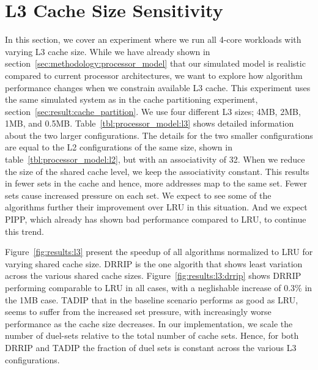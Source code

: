 \section{L3 Cache Size Sensitivity}
\label{sec:results:l3size_sensitivity}

In this section, we cover an experiment where we run all 4-core workloads with varying L3 cache size.
While we have already shown in section~\ref{sec:methodology:processor_model} that our simulated model is realistic compared to current processor architectures, we want to explore how algorithm performance changes when we constrain available L3 cache.
This experiment uses the same simulated system as in the cache partitioning experiment, section~\ref{sec:result:cache_partition}.
We use four different L3 sizes; 4MB, 2MB, 1MB, and 0.5MB.
Table~\ref{tbl:processor_model:l3} shows detailed information about the two larger configurations.
The details for the two smaller configurations are equal to the L2 configurations of the same size, shown in table~\ref{tbl:processor_model:l2}, but with an associativity of 32.
When we reduce the size of the shared cache level, we keep the associativity constant.
This results in fewer sets in the cache and hence, more addresses map to the same set.
Fewer sets cause increased pressure on each set.
We expect to see some of the algorithms further their improvement over LRU in this situation.
And we expect PIPP, which already has shown bad performance compared to LRU, to continue this trend.

Figure~\ref{fig:results:l3} present the speedup of all algorithms normalized to LRU for varying shared cache size.
DRRIP is the one algorith that shows least variation across the various shared cache sizes.
Figure~\ref{fig:results:l3:drrip} shows DRRIP performing comparable to LRU in all cases, with a neglishable increase of 0.3\% in the 1MB case.
TADIP that in the baseline scenario performs as good as LRU, seems to suffer from the increased set pressure, with increasingly worse performance as the cache size decreases.
In our implementation, we scale the number of duel-sets relative to the total number of cache sets.
Hence, for both DRRIP and TADIP the fraction of duel sets is constant across the various L3 configurations.

